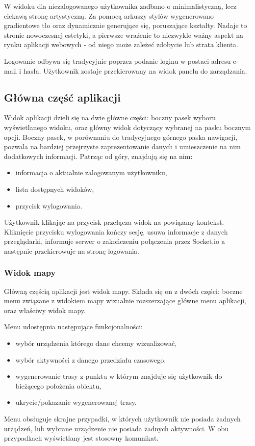 \documentclass[eng,printmode]{mgr}
\begin{document}
W widoku dla niezalogowanego użytkownika zadbano o minimalistyczną, lecz ciekawą stronę artystyczną. Za pomocą arkuszy stylów wygenerowano gradientowe tło oraz dynamicznie generujące się, poruszające kształty. Nadaje to stronie nowoczesnej estetyki, a pierwsze wrażenie to niezwykle ważny aspekt na rynku aplikacji webowych - od niego może zależeć zdobycie lub strata klienta.

Logowanie odbywa się tradycyjnie poprzez podanie loginu w postaci adresu e-mail i hasła. Użytkownik zostaje przekierowany na widok panelu do zarządzania. 

\subsection{Główna część aplikacji}
Widok aplikacji dzieli się na dwie główne części: boczny pasek wyboru wyświetlanego widoku, oraz główny widok dotyczący wybranej na pasku bocznym opcji. Boczny pasek, w porównaniu do tradycyjnego górnego paska nawigacji, pozwala na bardziej przejrzyste zaprezentowanie danych i umieszczenie na nim dodatkowych informacji. Patrząc od góry, znajdują się na nim:
\begin{itemize}
\item informacja o aktualnie zalogowanym użytkowniku,
\item lista dostępnych widoków,
\item przycisk wylogowania.
\end{itemize}
Użytkownik klikając na przycisk przełącza widok na powiązany kontekst. Kliknięcie przycisku wylogowania kończy sesję, usuwa informacje z danych przeglądarki, informuje serwer o zakończeniu połączenia przez Socket.io a następnie przekierowuje na stronę logowania.

\subsubsection{Widok mapy}
Główną częścią aplikacji jest widok mapy. Składa się on z dwóch części: boczne menu związane z widokiem mapy wizualnie rozszerzające główne menu aplikacji, oraz właściwy widok mapy.

Menu udostępnia następujące funkcjonalności:
\begin{itemize}
\item wybór urządzenia którego dane chcemy wizualizować,
\item wybór aktywności z danego przedziału czasowego,
\item wygenerowanie trasy z punktu w którym znajduje się użytkownik do bieżącego położenia obiektu,
\item ukrycie/pokazanie wygenerowanej trasy.
\end{itemize}
Menu obsługuje skrajne przypadki, w których użytkownik nie posiada żadnych urządzeń, lub wybrane urządzenie nie posiada żadnych aktywności. W obu przypadkach wyświetlany jest stosowny komunikat.
\end{document}
